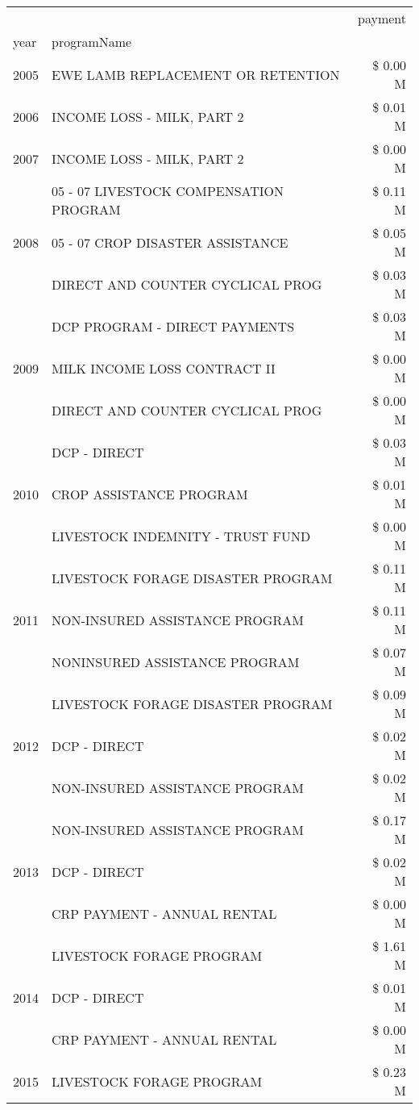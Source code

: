 \begin{tabular}{llr}
\toprule
 &  & payment \\
year & programName &  \\
\midrule
2005 & EWE LAMB REPLACEMENT OR RETENTION & \$ 0.00 M \\
\cline{1-3}
2006 & INCOME LOSS - MILK, PART 2 & \$ 0.01 M \\
\cline{1-3}
2007 & INCOME LOSS - MILK, PART 2 & \$ 0.00 M \\
\cline{1-3}
\multirow[t]{3}{*}{2008} & 05 - 07 LIVESTOCK COMPENSATION PROGRAM & \$ 0.11 M \\
 & 05 - 07 CROP DISASTER ASSISTANCE & \$ 0.05 M \\
 & DIRECT AND COUNTER CYCLICAL PROG & \$ 0.03 M \\
\cline{1-3}
\multirow[t]{3}{*}{2009} & DCP PROGRAM - DIRECT PAYMENTS & \$ 0.03 M \\
 & MILK INCOME LOSS CONTRACT II & \$ 0.00 M \\
 & DIRECT AND COUNTER CYCLICAL PROG & \$ 0.00 M \\
\cline{1-3}
\multirow[t]{3}{*}{2010} & DCP - DIRECT & \$ 0.03 M \\
 & CROP ASSISTANCE PROGRAM & \$ 0.01 M \\
 & LIVESTOCK INDEMNITY - TRUST FUND & \$ 0.00 M \\
\cline{1-3}
\multirow[t]{3}{*}{2011} & LIVESTOCK FORAGE DISASTER PROGRAM & \$ 0.11 M \\
 & NON-INSURED ASSISTANCE PROGRAM & \$ 0.11 M \\
 & NONINSURED ASSISTANCE PROGRAM & \$ 0.07 M \\
\cline{1-3}
\multirow[t]{3}{*}{2012} & LIVESTOCK FORAGE DISASTER PROGRAM & \$ 0.09 M \\
 & DCP - DIRECT & \$ 0.02 M \\
 & NON-INSURED ASSISTANCE PROGRAM & \$ 0.02 M \\
\cline{1-3}
\multirow[t]{3}{*}{2013} & NON-INSURED ASSISTANCE PROGRAM & \$ 0.17 M \\
 & DCP - DIRECT & \$ 0.02 M \\
 & CRP PAYMENT - ANNUAL RENTAL & \$ 0.00 M \\
\cline{1-3}
\multirow[t]{3}{*}{2014} & LIVESTOCK FORAGE PROGRAM & \$ 1.61 M \\
 & DCP - DIRECT & \$ 0.01 M \\
 & CRP PAYMENT - ANNUAL RENTAL & \$ 0.00 M \\
\cline{1-3}
\multirow[t]{2}{*}{2015} & LIVESTOCK FORAGE PROGRAM & \$ 0.23 M \\

\end{tabular}
